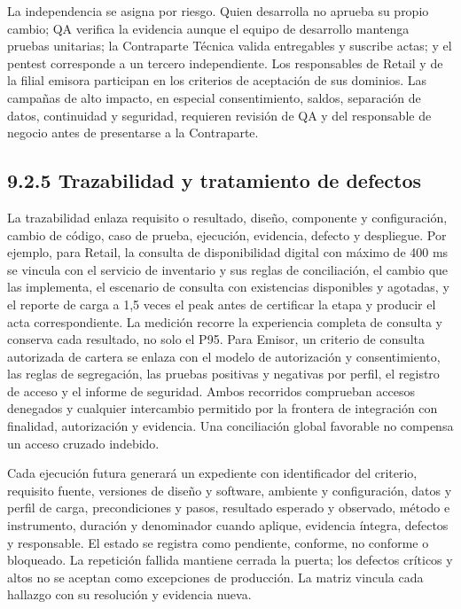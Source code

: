 \documentclass[11pt]{article}
\begin{document}
La independencia se asigna por riesgo. Quien desarrolla no aprueba su propio cambio; QA verifica la evidencia aunque el equipo de desarrollo mantenga pruebas unitarias; la Contraparte Técnica valida entregables y suscribe actas; y el pentest corresponde a un tercero independiente. Los responsables de Retail y de la filial emisora participan en los criterios de aceptación de sus dominios. Las campañas de alto impacto, en especial consentimiento, saldos, separación de datos, continuidad y seguridad, requieren revisión de QA y del responsable de negocio antes de presentarse a la Contraparte.

\subsection{9.2.5 Trazabilidad y tratamiento de defectos}

La trazabilidad enlaza requisito o resultado, diseño, componente y configuración, cambio de código, caso de prueba, ejecución, evidencia, defecto y despliegue. Por ejemplo, para Retail, la consulta de disponibilidad digital con máximo de 400 ms se vincula con el servicio de inventario y sus reglas de conciliación, el cambio que las implementa, el escenario de consulta con existencias disponibles y agotadas, y el reporte de carga a 1,5 veces el peak antes de certificar la etapa y producir el acta correspondiente. La medición recorre la experiencia completa de consulta y conserva cada resultado, no solo el P95. Para Emisor, un criterio de consulta autorizada de cartera se enlaza con el modelo de autorización y consentimiento, las reglas de segregación, las pruebas positivas y negativas por perfil, el registro de acceso y el informe de seguridad. Ambos recorridos comprueban accesos denegados y cualquier intercambio permitido por la frontera de integración con finalidad, autorización y evidencia. Una conciliación global favorable no compensa un acceso cruzado indebido.

Cada ejecución futura generará un expediente con identificador del criterio, requisito fuente, versiones de diseño y software, ambiente y configuración, datos y perfil de carga, precondiciones y pasos, resultado esperado y observado, método e instrumento, duración y denominador cuando aplique, evidencia íntegra, defectos y responsable. El estado se registra como pendiente, conforme, no conforme o bloqueado. La repetición fallida mantiene cerrada la puerta; los defectos críticos y altos no se aceptan como excepciones de producción. La matriz vincula cada hallazgo con su resolución y evidencia nueva.
\end{document}

